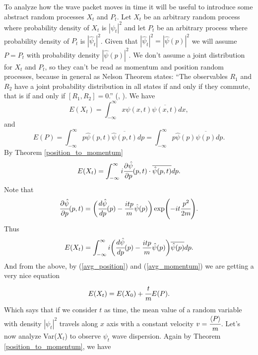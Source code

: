 \documentclass[main.tex]{subfiles}
\begin{document}
To analyze how the wave packet moves in time it will be useful to introduce some abstract random processes $X_t$ and $P_t$. Let $X_t$ be an arbitrary random process where probability density of $X_t$ is $|\psi_t|^2$ and let $P_t$ be an arbitrary process where probability density of $P_t$ is $|\hat{\psi}_t|^2$. Given that $|\hat{\psi}_t|^2 = |\hat{\psi}(p)|^2$ we will assume $P=P_t$ with probability density $|\hat{\psi}(p)|^2$. We don't assume a joint distribution for $X_t$ and $P_t$, so they can't be read as momentum and position random processes, because in general as Nelson Theorem states: ``The observables $R_1$ and $R_2$ have a joint probability distribution in all states if and only if they commute, that is if and only if $[R_1 , R_2] = 0$.'' (\cite{breure-petruccione2002}, \cite{nelson1967}).
We have
\begin{equation}
    E(X_t) = \int_{-\infty}^{\infty} x\psi(x, t) \overline{\psi(x, t)} dx,
\end{equation}
and 
\begin{equation}
\label{avg_momentum}
    E(P) = \int_{-\infty}^{\infty} p\hat{\psi}(p, t) \overline{\hat{\psi}(p, t)} dp = \int_{-\infty}^{\infty} p\hat{\psi}(p) \overline{\hat{\psi}(p)} dp.
\end{equation}
By Theorem \ref{position_to_momentum}
\begin{equation}
\label{avg_position}
    E(X_t) = \int_{-\infty}^{\infty} i\cfrac{\partial \hat{\psi}}{\partial p}(p,t)\cdot \overline{\hat{\psi}(p, t)} dp.
\end{equation}
Note that
\begin{equation}
    \cfrac{\partial \hat{\psi}}{\partial p}(p, t) = \bigg(\cfrac{d \hat{\psi}}{d p}(p) - \frac{itp}{m} \hat{\psi}(p)\bigg) \exp(-it\cfrac{p^2}{2m}).
\end{equation}
Thus
\begin{equation}
    E(X_t) = \int_{-\infty}^{\infty} i \bigg(\cfrac{d \hat{\psi}}{d p}(p) - \frac{itp}{m} \hat{\psi}(p)\bigg)\overline{\hat{\psi}(p)} dp.
\end{equation}
And from the above, by (\ref{avg_position}) and (\ref{avg_momentum}) we are getting a very nice equation
\begin{equation}
    E(X_t) = E(X_0) + \cfrac{t}{m}E(P).
\end{equation}
Which says that if we consider $t$ as time, the mean value of a random variable with density $|\psi_t|^2$ travels along $x$ axis with a constant velocity $v = \cfrac{\langle P\rangle}{m}$.
Let's now analyze Var($X_t$) to observe $\psi_t$ wave dispersion. Again by Theorem \ref{position_to_momentum}, we have
\end{document}
